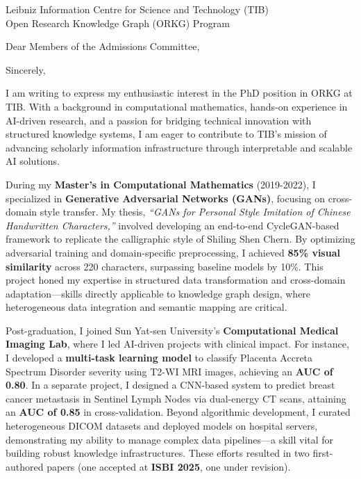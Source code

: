 \documentclass[11pt,a4paper, final]{moderncv}
\begin{document}
{Leibniz Information Centre for Science and Technology (TIB)\\
Open Research Knowledge Graph (ORKG) Program\\
}
\date{\today}
\opening{Dear Members of the Admissions Committee,}
\closing{Sincerely,}
\makelettertitle
\thispagestyle{empty}
\pagestyle{empty}
I am writing to express my enthusiastic interest in the PhD position in ORKG at TIB. 
With a background in computational mathematics, hands-on experience in AI-driven research, 
and a passion for bridging technical innovation with structured knowledge systems, 
I am eager to contribute to TIB's mission of advancing scholarly information infrastructure 
through interpretable and scalable AI solutions.

During my \textbf{Master's in Computational Mathematics} (2019-2022), 
I specialized in \textbf{Generative Adversarial Networks (GANs)}, 
focusing on cross-domain style transfer. 
My thesis, \emph{``GANs for Personal Style Imitation of Chinese Handwritten Characters,''} 
involved developing an end-to-end CycleGAN-based framework to replicate the calligraphic style of Shiling Shen Chern. 
By optimizing adversarial training and domain-specific preprocessing, 
I achieved \textbf{85\% visual similarity} across 220 characters, surpassing baseline models by 10\%. 
This project honed my expertise in structured data transformation and cross-domain adaptation—skills directly applicable to knowledge graph design, where heterogeneous data integration and semantic mapping are critical.

Post-graduation, I joined Sun Yat-sen University's \textbf{Computational Medical Imaging Lab}, 
where I led AI-driven projects with clinical impact. 
For instance, I developed a \textbf{multi-task learning model} to 
classify Placenta Accreta Spectrum Disorder severity using T2-WI MRI images, achieving an \textbf{AUC of 0.80}. 
In a separate project, 
I designed a CNN-based system to predict breast cancer metastasis in Sentinel Lymph Nodes via dual-energy CT scans, 
attaining an \textbf{AUC of 0.85} in cross-validation. 
Beyond algorithmic development, I curated heterogeneous DICOM datasets and deployed models on hospital servers, 
demonstrating my ability to manage complex data pipelines—a skill vital for building robust knowledge infrastructures. 
These efforts resulted in two first-authored papers (one accepted at \textbf{ISBI 2025}, one under revision).
\end{document}
